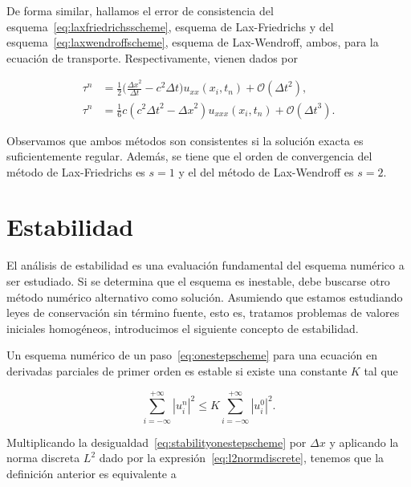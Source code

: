 De forma similar, hallamos el error de consistencia del
esquema~\eqref{eq:laxfriedrichsscheme}, esquema de Lax-Friedrichs y
del esquema~\eqref{eq:laxwendroffscheme}, esquema de Lax-Wendroff,
ambos, para la ecuación de transporte.
Respectivamente, vienen dados por

\begin{align*}
  \tau^{n} & =
  \frac{1}{2}
  \big(
  \frac{{\Delta x}^{2}}{\Delta t}-
  c^{2}\Delta t
  \big)
  u_{xx}
  \left(x_{i},t_{n}\right)+
  \mathcal{O}
  \left({\Delta t}^{2}\right), \\
  \tau^{n} & =
  \frac{1}{6}
  c
  \left(
  c^{2}{\Delta t}^{2}-
  {\Delta x}^{2}
  \right)
  u_{xxx}\left(x_{i},t_{n}\right)+
  \mathcal{O}\left({\Delta t}^{3}\right).
\end{align*}

Observamos que ambos métodos son consistentes si la solución exacta
es suficientemente regular.
Además, se tiene que el orden de convergencia del método de
Lax-Friedrichs es $s=1$ y el del método de Lax-Wendroff es $s=2$.

\section{Estabilidad}

El análisis de estabilidad es una evaluación fundamental del esquema
numérico a ser estudiado.
Si se determina que el esquema es inestable, debe buscarse otro
método numérico alternativo como solución.
Asumiendo que estamos estudiando leyes de conservación sin
término fuente, esto es, tratamos problemas de valores iniciales
homogéneos, introducimos el siguiente concepto de estabilidad.

\begin{definition}
  Un esquema numérico de un paso~\eqref{eq:onestepscheme} para una
  ecuación en derivadas parciales de primer orden es estable si
  existe una constante $K$ tal que

  \begin{equation}\label{eq:stabilityonestepscheme}
    \sum_{i=-\infty}^{+\infty}
    {\left|u^{n}_{i}\right|}^{2}\leq
    K
    \sum_{i=-\infty}^{+\infty}
    {\left|u^{0}_{i}\right|}^{2}.
  \end{equation}
\end{definition}

Multiplicando la desigualdad~\eqref{eq:stabilityonestepscheme} por
$\Delta x$ y aplicando la norma discreta $L^{2}$ dado por la
expresión~\eqref{eq:l2normdiscrete}, tenemos que la definición
anterior es equivalente a

